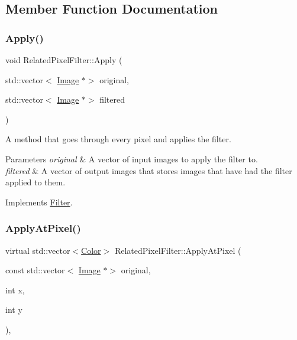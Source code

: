 \subsection{Member Function Documentation}
\mbox{\label{classRelatedPixelFilter_a4f78d98d7f5ddc55f1e5e0f029b2bfbe}} 
\subsubsection{\texorpdfstring{Apply()}{Apply()}}
{\footnotesize\ttfamily void Related\+Pixel\+Filter\+::\+Apply (\begin{DoxyParamCaption}\item[{std\+::vector$<$ \hyperlink{classImage}{Image} $\ast$$>$}]{original,  }\item[{std\+::vector$<$ \hyperlink{classImage}{Image} $\ast$$>$}]{filtered }\end{DoxyParamCaption})\hspace{0.3cm}{\ttfamily [virtual]}}



A method that goes through every pixel and applies the filter. 


\begin{DoxyParams}{Parameters}
{\em original} & A vector of input images to apply the filter to. \\
\hline
{\em filtered} & A vector of output images that stores images that have had the filter applied to them. \\
\hline
\end{DoxyParams}


Implements \hyperlink{classFilter_afab0d50af44a19a370ebe46c69b8ff4e}{Filter}.

\mbox{\label{classRelatedPixelFilter_a4701695c3b2ca7fdcc41b3d03c5840df}} 
\subsubsection{\texorpdfstring{Apply\+At\+Pixel()}{ApplyAtPixel()}}
{\footnotesize\ttfamily virtual std\+::vector$<$\hyperlink{classColor}{Color}$>$ Related\+Pixel\+Filter\+::\+Apply\+At\+Pixel (\begin{DoxyParamCaption}\item[{const std\+::vector$<$ \hyperlink{classImage}{Image} $\ast$$>$}]{original,  }\item[{int}]{x,  }\item[{int}]{y }\end{DoxyParamCaption})\hspace{0.3cm}{\ttfamily [protected]}, {}}



